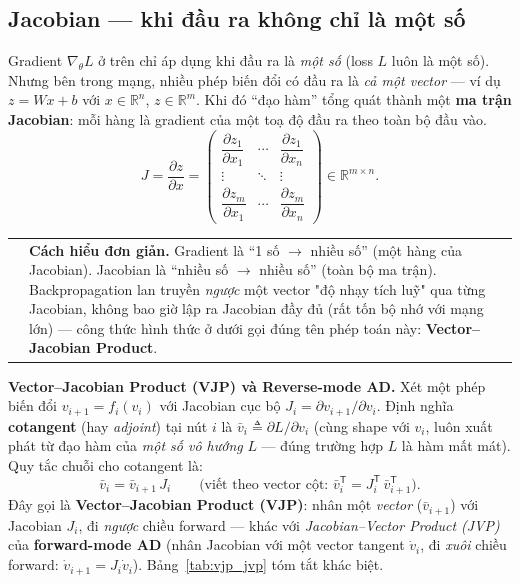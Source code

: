 \documentclass[12pt,a4paper]{article}
\makeatletter
\newenvironment{tructiep}[1][Cách hiểu đơn giản]
  {\par\smallskip\noindent\begin{tabular}{@{}p{0.35em}@{\hspace{6pt}}p{\dimexpr\linewidth-1.9em\relax}@{}}
   \textcolor{boxln}{\rule{2pt}{\baselineskip}} & \textbf{#1.}\enspace\ignorespaces}
  {\end{tabular}\par\smallskip}
\newcommand{\en}[1]{\textit{#1}}
\newcommand{\T}{^{\mathsf{T}}}
\makeatother
\begin{document}
\subsection{Jacobian --- khi đầu ra không chỉ là một số}
\label{sec:jacobian}

Gradient $\nabla_\theta L$ ở trên chỉ áp dụng khi đầu ra là \emph{một số}
(loss $L$ luôn là một số). Nhưng bên trong mạng, nhiều phép biến đổi có
đầu ra là \emph{cả một vector} --- ví dụ $z=Wx+b$ với $x\in\mathbb R^n$,
$z\in\mathbb R^m$. Khi đó ``đạo hàm'' tổng quát thành một \textbf{ma trận
Jacobian}: mỗi hàng là gradient của một toạ độ đầu ra theo toàn bộ đầu vào.
$$J = \frac{\partial z}{\partial x} = \begin{pmatrix}
\dfrac{\partial z_1}{\partial x_1} & \cdots & \dfrac{\partial z_1}{\partial x_n} \\[4pt]
\vdots & \ddots & \vdots \\[2pt]
\dfrac{\partial z_m}{\partial x_1} & \cdots & \dfrac{\partial z_m}{\partial x_n}
\end{pmatrix} \in \mathbb R^{m\times n}.$$

\begin{tructiep}
Gradient là ``1 số $\to$ nhiều số'' (một hàng của Jacobian). Jacobian là
``nhiều số $\to$ nhiều số'' (toàn bộ ma trận). Backpropagation lan truyền
\emph{ngược} một vector "độ nhạy tích luỹ" qua từng Jacobian, không bao giờ
lập ra Jacobian đầy đủ (rất tốn bộ nhớ với mạng lớn) --- công thức hình
thức ở dưới gọi đúng tên phép toán này: \textbf{Vector--Jacobian Product}.
\end{tructiep}

\textbf{Vector--Jacobian Product (VJP) và Reverse-mode AD.} Xét một phép
biến đổi $v_{i+1}=f_i(v_i)$ với Jacobian cục bộ $J_i=\partial v_{i+1}/\partial v_i$.
Định nghĩa \textbf{cotangent} (hay \emph{adjoint}) tại nút $i$ là
$\bar v_i \triangleq \partial L/\partial v_i$ (cùng shape với $v_i$, luôn
xuất phát từ đạo hàm của \emph{một số vô hướng} $L$ --- đúng trường hợp
$L$ là hàm mất mát). Quy tắc chuỗi cho cotangent là:
$$\bar v_i = \bar v_{i+1}\,J_i \qquad \Big(\text{viết theo vector cột: } \bar v_i\T = J_i\T\,\bar v_{i+1}\T\Big).$$
Đây gọi là \textbf{Vector--Jacobian Product (VJP)}: nhân một \emph{vector}
($\bar v_{i+1}$) với Jacobian $J_i$, đi \emph{ngược} chiều forward --- khác
với \en{Jacobian--Vector Product (JVP)} của \textbf{forward-mode AD} (nhân
Jacobian với một vector tangent $\dot v_i$, đi \emph{xuôi} chiều forward:
$\dot v_{i+1}=J_i\dot v_i$). Bảng~\ref{tab:vjp_jvp} tóm tắt khác biệt.
\end{document}
